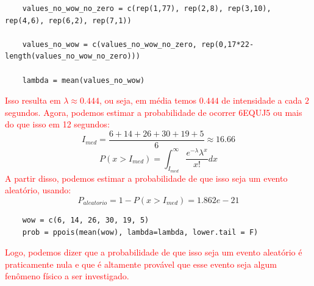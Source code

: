 \vspace{0.8cm}

\begin{lstlisting}
    values_no_wow_no_zero = c(rep(1,77), rep(2,8), rep(3,10), rep(4,6), rep(6,2), rep(7,1))
    
    values_no_wow = c(values_no_wow_no_zero, rep(0,17*22-length(values_no_wow_no_zero)))

    lambda = mean(values_no_wow)
\end{lstlisting}

\textcolor{red}{Isso resulta em $\lambda\approx0.444$, ou seja, em média temos $0.444$ de intensidade a cada $2$ segundos. Agora, podemos estimar a probabilidade de ocorrer 6EQUJ5 ou mais do que isso em 12 segundos:}
$$
I_{med} = \frac{6 +14+ 26+ 30+ 19+ 5}{6}\approx16.66
$$
$$
P(x>I_{med}) = \int_{I_{med}}^\infty \frac{e^{-\lambda}\lambda^x}{x!} dx
$$
\textcolor{red}{A partir disso, podemos estimar a probabilidade de que isso seja um evento aleatório, usando:}
$$
P_{aleatorio} = 1-P(x>I_{med})=1.862e-21
$$

\begin{lstlisting}
    wow = c(6, 14, 26, 30, 19, 5)
    prob = ppois(mean(wow), lambda=lambda, lower.tail = F)
\end{lstlisting}

\textcolor{red}{Logo, podemos dizer que a probabilidade de que isso seja um evento aleatório é praticamente nula e que é altamente provável que esse evento seja algum fenômeno físico a ser investigado.}